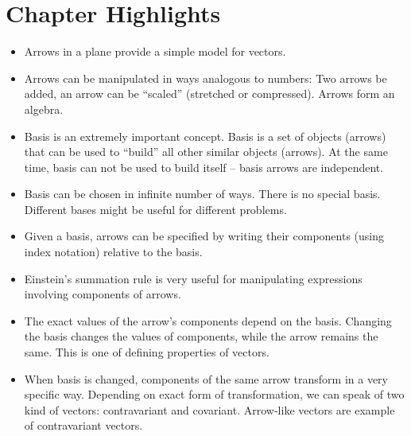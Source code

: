 \section*{Chapter Highlights}
{\chhc
  \it
  \small
\begin{itemize}
\item Arrows in a plane provide a simple model for vectors.
\item Arrows can be manipulated in ways analogous to numbers: Two arrows
  be added, an arrow can be ``scaled'' (stretched or compressed). Arrows form
  an algebra.
\item Basis is an extremely important concept. Basis is a set of
  objects (arrows) that can be used to ``build'' all other similar
  objects (arrows). At the same time, basis can not be used to build
  itself -- basis arrows are independent.
\item Basis can be chosen in infinite number of ways. There is no
  special basis. Different bases might be useful for different
  problems.
\item Given a basis, arrows can be specified by writing their
  components (using index notation) relative to the basis.
\item Einstein's summation rule is very useful for manipulating
  expressions involving components of arrows.
\item The exact values of the arrow's components depend on the
  basis. Changing the basis changes the values of components, while
  the arrow remains the same. This is one of defining properties of
  vectors.
\item When basis is changed, components of the same arrow transform in a
  very specific way. Depending on exact form of transformation, we can
  speak of two kind of vectors: contravariant and
  covariant. Arrow-like vectors are example of contravariant vectors.
\end{itemize}
}
